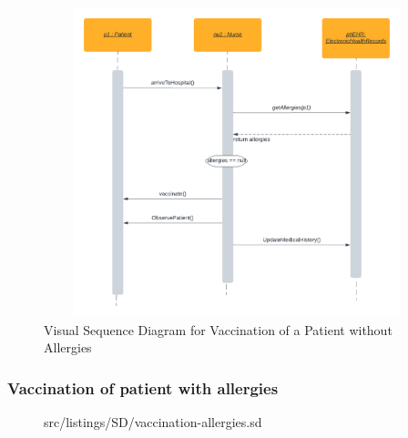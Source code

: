 \begin{figure}[]
\begin{center}\includegraphics[width=12cm, height = 9cm]{src/pic/Vaccination_Without_Allergies.png}\end{center}
\caption{Visual Sequence Diagram for Vaccination of a Patient without Allergies}
\label{VAC1}
\end{figure}

\subsubsection{Vaccination of patient with allergies}

\begin{figure}[hbt]
\lstset{language=MontiArc}
 {src/listings/SD/vaccination-allergies.sd}
\end{figure}


